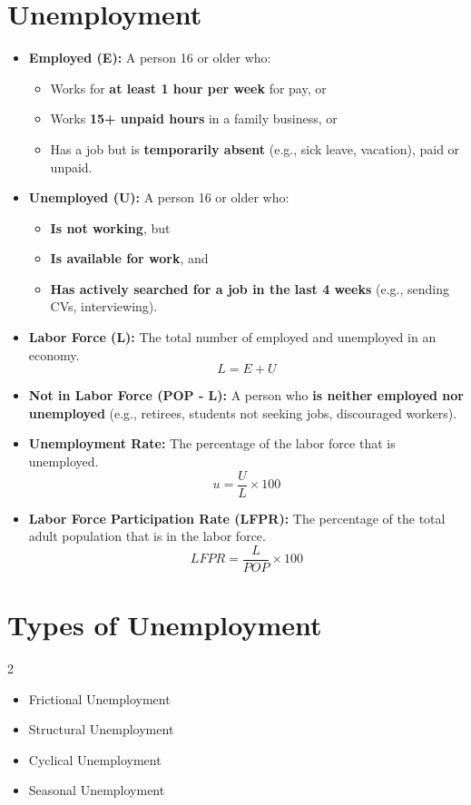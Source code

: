 \documentclass[a4paper, 11pt]{article}
\begin{document}
\section{Unemployment}
\begin{itemize}
    \item \textbf{Employed (E):} A person 16 or older who:
    \begin{itemize}
        \item Works for \textbf{at least 1 hour per week} for pay, or
        \item Works \textbf{15+ unpaid hours} in a family business, or
        \item Has a job but is \textbf{temporarily absent} (e.g., sick leave, vacation), paid or unpaid.
    \end{itemize}
    \item \textbf{Unemployed (U):} A person 16 or older who:
    \begin{itemize}
        \item \textbf{Is not working}, but
        \item \textbf{Is available for work}, and
        \item \textbf{Has actively searched for a job in the last 4 weeks} (e.g., sending CVs, interviewing).
    \end{itemize}
    \item \textbf{Labor Force (L):} The total number of employed and unemployed in an economy.
    \[ L=E+U \]
    \item \textbf{Not in Labor Force (POP - L):} A person who \textbf{is neither employed nor unemployed} (e.g., retirees, students not seeking jobs, discouraged workers).
    \item \textbf{Unemployment Rate:} The percentage of the labor force that is unemployed.
    \[ u=\frac{U}{L}\times 100 \]
    \item \textbf{Labor Force Participation Rate (LFPR):} The percentage of the total adult population that is in the labor force.
    \[ LFPR=\frac{L}{POP}\times 100 \]
\end{itemize}

\section{Types of Unemployment}
\begin{multicols}{2}
    \begin{itemize}
        \item Frictional Unemployment
        \item Structural Unemployment
        \item Cyclical Unemployment
        \item Seasonal Unemployment
    \end{itemize}
\end{multicols}
\end{document}
